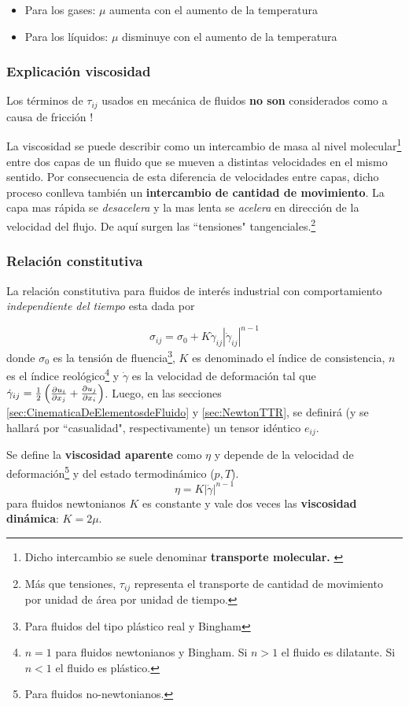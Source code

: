 \begin{itemize}
    \item Para los gases: $\mu$ aumenta con el aumento de la temperatura
    \item Para los líquidos: $\mu$ disminuye con el aumento de la temperatura
\end{itemize}
\subsubsection*{Explicación viscosidad}
Los términos de $\tau_{ij}$ usados en mecánica de fluidos \textbf{no son} considerados como a causa de fricción \citep{durst2008fluid}! 

La viscosidad se puede describir como un intercambio de masa al nivel molecular\footnote{Dicho intercambio se suele denominar \textbf{transporte molecular.} \label{foot:transporteMolecular}} entre dos capas de un fluido que se mueven a distintas velocidades en el mismo sentido. Por consecuencia de esta diferencia de velocidades entre capas, dicho proceso conlleva también un \textbf{intercambio de cantidad de movimiento}. La capa mas rápida se \textit{desacelera} y la mas lenta se \textit{acelera} en dirección de la velocidad del flujo. De aquí surgen las ``tensiones"{} tangenciales.\footnote{Más que tensiones, $\tau_{ij}$ representa el transporte de cantidad de movimiento por unidad de área por unidad de tiempo.}


\subsubsection*{Relación constitutiva}
La relación constitutiva para fluidos de interés industrial con comportamiento \textit{independiente del tiempo} esta dada por

\[
\sigma_{ij}=\sigma_0+K\dot{\gamma}_{ij} \left| \dot{\gamma}_{ij}\right|^{n-1}
\]
donde $\sigma_0$ es la tensión de fluencia\footnote{Para fluidos del tipo plástico real y Bingham}, $K$ es denominado el índice de consistencia, $n$ es el índice reológico\footnote{$n=1$ para fluidos newtonianos y Bingham. Si $n>1$ el fluido es dilatante. Si $n<1$ el fluido es plástico.} y $\dot{\gamma}$ es la velocidad de deformación tal que $\dot{\gamma}_{ij}=\frac{1}{2}\left( \frac{\partial u_i}{\partial x_j}+\frac{\partial u_j}{\partial x_i}\right)$. Luego, en las secciones \ref{sec:CinematicaDeElementosdeFluido} y \ref{sec:NewtonTTR}, se definirá (y se hallará por ``casualidad", respectivamente) un tensor idéntico $e_{ij}$.

Se define la \textbf{viscosidad aparente} como $\eta$ y depende de la velocidad de deformación\footnote{Para fluidos no-newtonianos.} y del estado termodinámico ($p,T$).
\[
\eta=K\left| \dot{\gamma} \right|^{n-1}
\]
para fluidos newtonianos $K$ es constante y vale dos veces las \textbf{viscosidad dinámica}: $K=2\mu$.

